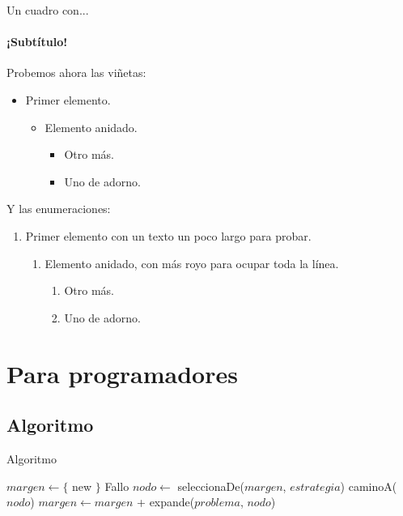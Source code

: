 \documentclass[aspectratio=169,usenames,dvipsnames,svgnames,table]{beamer}
\begin{document}
\begin{frame}{Un cuadro con...}
\framesubtitle{¡Subtítulo!}
Probemos ahora las viñetas:
\begin{itemize}
 \item Primer elemento.
 \begin{itemize}
  \item Elemento anidado.
  \begin{itemize}
   \item Otro más.
   \item Uno de adorno.
  \end{itemize}
 \end{itemize}
\end{itemize}

Y las enumeraciones:
\begin{enumerate}
 \item Primer elemento con un texto un poco largo para probar.
 \begin{enumerate}
  \item Elemento anidado, con más royo para ocupar toda la línea.
  \begin{enumerate}
   \item Otro más.
   \item Uno de adorno.
  \end{enumerate}
 \end{enumerate}
\end{enumerate}

\end{frame}



\section{Para programadores}
\subsection{Algoritmo}

\begin{frame}{Algoritmo}
\vspace*{-8pt}
\begin{algorithm}[H]
\caption{Búsqueda en un árbol.}\label{alg:busqueda_general}
\begin{algorithmic}[1]
   \State $margen \leftarrow \{$ new $\}$
   \Loop
     \Return Fallo \EndIf
    \State $nodo \leftarrow$ seleccionaDe($margen$, $estrategia$)
     \State \Return caminoA($nodo$)
    \EndIf
    \State $margen \leftarrow margen$ + expande($problema$, $nodo$) \label{alg:estrategia}
   \EndLoop
  \EndFunction
\end{algorithmic}
\end{algorithm}
\end{frame}
\end{document}

